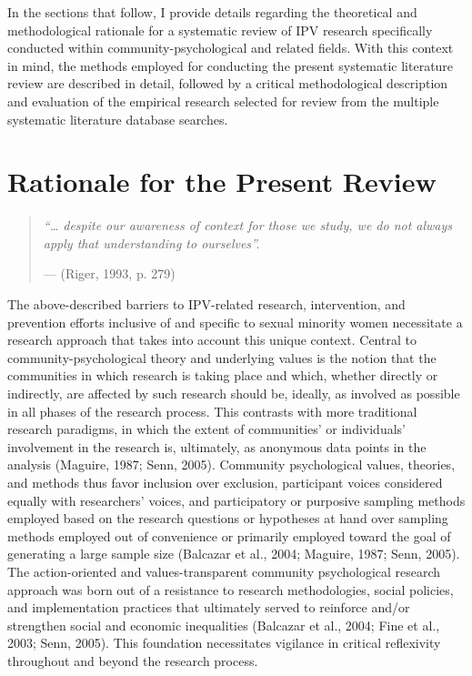 \documentclass[11pt,]{tufte-book}
\begin{document}
In the sections that follow, I provide details regarding the theoretical
and methodological rationale for a systematic review of IPV research
specifically conducted within community-psychological and related
fields. With this context in mind, the methods employed for conducting
the present systematic literature review are described in detail,
followed by a critical methodological description and evaluation of the
empirical research selected for review from the multiple systematic
literature database searches.

\chapter{Rationale for the Present
Review}\label{rationale-for-the-present-review}

\begin{quote}
\emph{``\ldots{} despite our awareness of context for those we study, we
do not always apply that understanding to ourselves''.}

\hfill --- (Riger, 1993, p. 279)
\end{quote}

The above-described barriers to IPV-related research, intervention, and
prevention efforts inclusive of and specific to sexual minority women
necessitate a research approach that takes into account this unique
context. Central to community-psychological theory and underlying values
is the notion that the communities in which research is taking place and
which, whether directly or indirectly, are affected by such research
should be, ideally, as involved as possible in all phases of the
research process. This contrasts with more traditional research
paradigms, in which the extent of communities' or individuals'
involvement in the research is, ultimately, as anonymous data points in
the analysis (Maguire, 1987; Senn, 2005). Community psychological
values, theories, and methods thus favor inclusion over exclusion,
participant voices considered equally with researchers' voices, and
participatory or purposive sampling methods employed based on the
research questions or hypotheses at hand over sampling methods employed
out of convenience or primarily employed toward the goal of generating a
large sample size (Balcazar et al., 2004; Maguire, 1987; Senn, 2005).
The action-oriented and values-transparent community psychological
research approach was born out of a resistance to research
methodologies, social policies, and implementation practices that
ultimately served to reinforce and/or strengthen social and economic
inequalities (Balcazar et al., 2004; Fine et al., 2003; Senn, 2005).
This foundation necessitates vigilance in critical reflexivity
throughout and beyond the research process.
\end{document}
